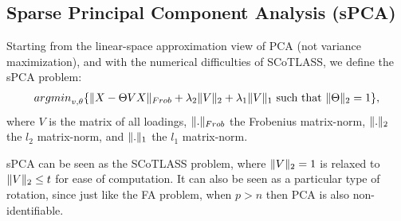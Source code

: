 \documentclass[12pt,a4paper]{article}
\begin{document}
\subsection{Sparse Principal Component Analysis (sPCA)}
\label{sec:sPCA}

Starting from the linear-space approximation view of PCA (not variance maximization), and with the numerical difficulties of SCoTLASS, we define the sPCA problem:
\begin{align}
\label{eq:spca}
	\textstyle{\mathop{argmin}_{v,\theta}}\{ \Vert X-\Theta V X \Vert_{Frob} + \lambda_2 \Vert V \Vert_2 + \lambda_1 \Vert V \Vert_1 \text{ such that } \Vert \Theta \Vert_2=1 \},
\end{align}
where $V$ is the matrix of all loadings, $\Vert . \Vert_{Frob}$ the Frobenius matrix-norm, $\Vert . \Vert_2$ the $l_2$ matrix-norm, and $\Vert . \Vert_1$ the $l_1$ matrix-norm.

sPCA can be seen as the SCoTLASS problem, where $\Vert V \Vert_2=1$ is relaxed to $ \Vert V \Vert_2\leq t$ for ease of computation.
It can also be seen as a particular type of rotation, since just like the FA problem, when $p>n$ then PCA is also non-identifiable. 







\newpage


\end{document}
